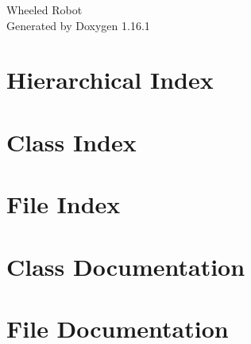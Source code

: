 \documentclass[twoside]{book}
\newcommand{\+}{\discretionary{\mbox{\scriptsize$\hookleftarrow$}}{}{}}
\newcommand{\clearemptydoublepage}{%
    \newpage{\pagestyle{empty}\cleardoublepage}%
  }
\begin{document}
  \raggedbottom
    \hypersetup{pageanchor=false,
                bookmarksnumbered=true,
                pdfencoding=unicode
               }
  \begin{titlepage}
  \vspace*{7cm}
  \begin{center}%
  {\Large Wheeled Robot}\\
  \vspace*{1cm}
  {\large Generated by Doxygen 1.16.1}\\
  \end{center}
  \end{titlepage}
  \clearemptydoublepage
  \tableofcontents
  \clearemptydoublepage
  \hypersetup{pageanchor=true}
\chapter{Hierarchical Index}

\chapter{Class Index}

\chapter{File Index}

\chapter{Class Documentation}
















\chapter{File Documentation}








  \backmatter
  \newpage
  \clearemptydoublepage
  \printindex
\end{document}
